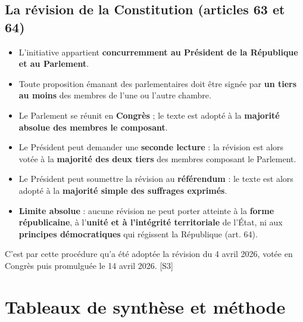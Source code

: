 \documentclass[11pt,a4paper,oneside]{report}
\newcommand{\src}[1]{\textcolor{bluec}{\scriptsize[#1]}}
\begin{document}
\section{La révision de la Constitution (articles 63 et 64)}
\begin{itemize}
  \item L'initiative appartient \textbf{concurremment au Président de la République et au Parlement}.
  \item Toute proposition émanant des parlementaires doit être signée par \textbf{un tiers au moins} des membres de l'une ou l'autre chambre.
  \item Le Parlement se réunit en \textbf{Congrès} ; le texte est adopté à la \textbf{majorité absolue des membres le composant}.
  \item Le Président peut demander une \textbf{seconde lecture} : la révision est alors votée à la \textbf{majorité des deux tiers} des membres composant le Parlement.
  \item Le Président peut soumettre la révision au \textbf{référendum} : le texte est alors adopté à la \textbf{majorité simple des suffrages exprimés}.
  \item \textbf{Limite absolue} : aucune révision ne peut porter atteinte à la \textbf{forme républicaine}, à l'\textbf{unité et à l'intégrité territoriale} de l'État, ni aux \textbf{principes démocratiques} qui régissent la République (art. 64).
\end{itemize}
C'est par cette procédure qu'a été adoptée la révision du 4 avril 2026, votée en Congrès puis promulguée le 14 avril 2026. \src{S3}

\chapter{Tableaux de synthèse et méthode}
\end{document}
